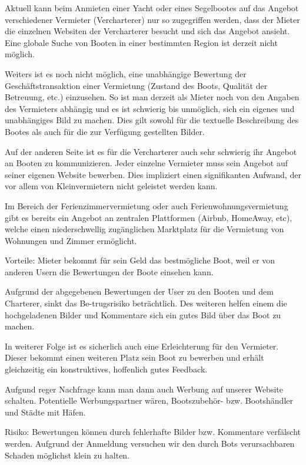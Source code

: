 \documentclass[12pt]{article}
\theoremstyle{definition}
\begin{document}
	Aktuell kann beim Anmieten einer Yacht oder eines Segelbootes auf das Angebot verschiedener Vermieter (Vercharterer) nur so zugegriffen werden, dass der Mieter die einzelnen Websiten der Vercharterer besucht und sich das Angebot ansieht. Eine globale Suche von Booten in einer bestimmten Region ist derzeit nicht möglich.
	
	Weiters ist es noch nicht möglich, eine unabhängige Bewertung der Geschäfts\-trans\-aktion einer Vermietung (Zustand des Boots, Qualität der Betreuung, etc.) einzusehen. So ist man derzeit als Mieter noch von den Angaben des Vermieters abhängig und es ist schwierig bis unmöglich, sich ein eigenes und unabhängiges Bild zu machen. Dies gilt sowohl für die textuelle Beschreibung des Bootes als auch für die zur Verfügung gestellten Bilder.
	
	Auf der anderen Seite ist es für die Vercharterer auch sehr schwierig ihr Angebot an Booten zu kommunizieren. Jeder einzelne Vermieter muss sein Angebot auf seiner eigenen Website bewerben. Dies impliziert einen signifikanten Aufwand, der vor allem von Kleinvermietern nicht geleistet werden kann.
	
	Im Bereich der Ferienzimmervermietung oder auch Ferienwohnungsvermietung gibt es bereits ein Angebot an zentralen Plattformen (Airbnb, HomeAway, etc), welche einen niederschwellig zugänglichen Marktplatz für die Vermietung von Wohnungen und Zimmer ermöglicht.
	
	Vorteile:
	Mieter bekommt für sein Geld das bestmögliche Boot, weil er von anderen Usern die Bewertungen der Boote einsehen kann.
	
	Aufgrund der abgegebenen Bewertungen der User zu den Booten und dem Charterer, sinkt das Be-trugsrisiko beträchtlich. Des weiteren helfen einem die hochgeladenen Bilder und Kommentare sich ein gutes Bild über das Boot zu machen.
	
	In weiterer Folge ist es sicherlich auch eine Erleichterung für den Vermieter. Dieser bekommt einen weiteren Platz sein Boot zu bewerben und erhält gleichzeitig ein konstruktives, hoffenlich gutes Feedback.
	
	Aufgund reger Nachfrage kann man dann auch Werbung auf unserer Website schalten. Potentielle Werbungspartner wären, Bootszubehör- bzw. Bootshändler und Städte mit Häfen.
	
	Risiko:
	Bewertungen können durch fehlerhafte Bilder bzw. Kommentare verfälscht werden. Aufgrund der Anmeldung versuchen wir den durch Bots verursachbaren Schaden möglichst klein zu halten.	
\end{document}
